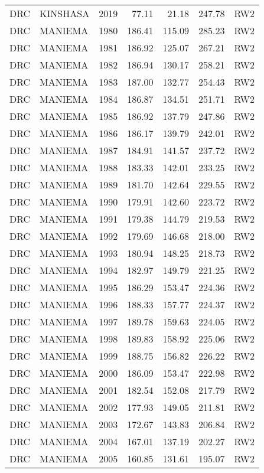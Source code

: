 \begin{longtable}{lllrrrl}
  DRC & KINSHASA & 2019 & 77.11 & 21.18 & 247.78 & RW2 \\ 
  DRC & MANIEMA & 1980 & 186.41 & 115.09 & 285.23 & RW2 \\ 
  DRC & MANIEMA & 1981 & 186.92 & 125.07 & 267.21 & RW2 \\ 
  DRC & MANIEMA & 1982 & 186.94 & 130.17 & 258.21 & RW2 \\ 
  DRC & MANIEMA & 1983 & 187.00 & 132.77 & 254.43 & RW2 \\ 
  DRC & MANIEMA & 1984 & 186.87 & 134.51 & 251.71 & RW2 \\ 
  DRC & MANIEMA & 1985 & 186.92 & 137.79 & 247.86 & RW2 \\ 
  DRC & MANIEMA & 1986 & 186.17 & 139.79 & 242.01 & RW2 \\ 
  DRC & MANIEMA & 1987 & 184.91 & 141.57 & 237.72 & RW2 \\ 
  DRC & MANIEMA & 1988 & 183.33 & 142.01 & 233.25 & RW2 \\ 
  DRC & MANIEMA & 1989 & 181.70 & 142.64 & 229.55 & RW2 \\ 
  DRC & MANIEMA & 1990 & 179.91 & 142.60 & 223.72 & RW2 \\ 
  DRC & MANIEMA & 1991 & 179.38 & 144.79 & 219.53 & RW2 \\ 
  DRC & MANIEMA & 1992 & 179.69 & 146.68 & 218.00 & RW2 \\ 
  DRC & MANIEMA & 1993 & 180.94 & 148.25 & 218.73 & RW2 \\ 
  DRC & MANIEMA & 1994 & 182.97 & 149.79 & 221.25 & RW2 \\ 
  DRC & MANIEMA & 1995 & 186.29 & 153.47 & 224.36 & RW2 \\ 
  DRC & MANIEMA & 1996 & 188.33 & 157.77 & 224.37 & RW2 \\ 
  DRC & MANIEMA & 1997 & 189.78 & 159.63 & 224.05 & RW2 \\ 
  DRC & MANIEMA & 1998 & 189.83 & 158.92 & 225.06 & RW2 \\ 
  DRC & MANIEMA & 1999 & 188.75 & 156.82 & 226.22 & RW2 \\ 
  DRC & MANIEMA & 2000 & 186.09 & 153.47 & 222.98 & RW2 \\ 
  DRC & MANIEMA & 2001 & 182.54 & 152.08 & 217.79 & RW2 \\ 
  DRC & MANIEMA & 2002 & 177.93 & 149.05 & 211.81 & RW2 \\ 
  DRC & MANIEMA & 2003 & 172.67 & 143.83 & 206.84 & RW2 \\ 
  DRC & MANIEMA & 2004 & 167.01 & 137.19 & 202.27 & RW2 \\ 
  DRC & MANIEMA & 2005 & 160.85 & 131.61 & 195.07 & RW2 \\ 

\end{longtable}
